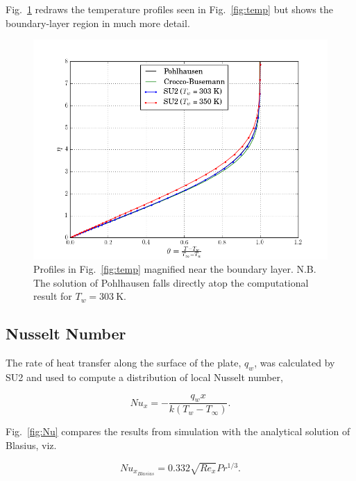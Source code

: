 \documentclass[12pt,letterpaper]{article}
\begin{document}
Fig.~\ref{fig:temp_zoom} redraws the temperature profiles seen in Fig.~\ref{fig:temp} but shows the boundary-layer region in much more detail.
 
\begin{figure}[h] 
\centering
\includegraphics[width=\linewidth]{temp_zoom.png}
\caption{Profiles in Fig.~\ref{fig:temp} magnified near the boundary layer. N.B. The solution of Pohlhausen falls directly atop the computational result for $T_w = \SI{303}{\kelvin}$.}
\label{fig:temp_zoom}
\end{figure}

\subsection*{Nusselt Number}
The rate of heat transfer along the surface of the plate, $q_w$, was calculated by SU2 and used to compute a distribution of local Nusselt number,

\begin{equation*}
Nu_x = -\dfrac{q_wx}{k\left(T_w-T_\infty\right)}.
\end{equation*} 

Fig.~\ref{fig:Nu} compares the results from simulation with the analytical solution of Blasius, viz.

\begin{equation*}
Nu_{x_{Blasius}} = 0.332\sqrt{Re_x}Pr^{1/3}.
\end{equation*} 
\end{document}
